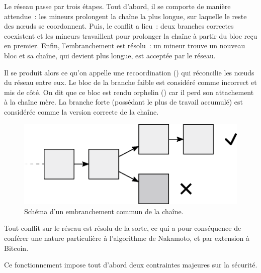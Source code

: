 Le réseau passe par trois étapes. Tout d'abord, il se comporte de manière attendue~: les mineurs prolongent la chaîne la plus longue, sur laquelle le reste des nœuds se coordonnent. Puis, le conflit a lieu~: deux branches correctes coexistent et les mineurs travaillent pour prolonger la chaîne à partir du bloc reçu en premier. Enfin, l'embranchement est résolu~: un mineur trouve un nouveau bloc et sa chaîne, qui devient plus longue, est acceptée par le réseau.

Il se produit alors ce qu'on appelle une recoordination () qui réconcilie les nœuds du réseau entre eux. Le bloc de la branche faible est considéré comme incorrect et mis de côté. On dit que ce bloc est rendu orphelin () car il perd son attachement à la chaîne mère. La branche forte (possédant le plus de travail accumulé) est considérée comme la version correcte de la chaîne.

\begin{figure}[h]
  \centering
  \includegraphics[scale=0.8]{img/blockchain-common-fork.eps}
  \caption{Schéma d'un embranchement commun de la chaîne.}
  \label{fig:blockchain-common-fork}
\end{figure}

Tout conflit sur le réseau est résolu de la sorte, ce qui a pour conséquence de conférer une nature particulière à l'algorithme de Nakamoto, et par extension à Bitcoin.



Ce fonctionnement impose tout d'abord deux contraintes majeures sur la sécurité.

